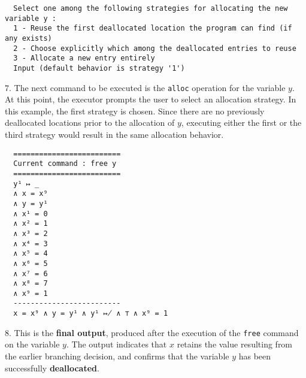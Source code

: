 \documentclass[parskip=half]{scrartcl}
\begin{document}
\begin{verbatim}
  Select one among the following strategies for allocating the new variable y :
  1 - Reuse the first deallocated location the program can find (if any exists)
  2 - Choose explicitly which among the deallocated entries to reuse
  3 - Allocate a new entry entirely
  Input (default behavior is strategy '1')
\end{verbatim}
7. The next command to be executed is the \texttt{alloc} operation for the variable $y$. At this point, the executor prompts the user to select an allocation strategy. In this example, the first strategy is chosen. Since there are no previously deallocated locations prior to the allocation of $y$, executing either the first or the third strategy would result in the same allocation behavior.

\begin{verbatim}
  =========================
  Current command : free y
  =========================
  y¹ ↦ _
  ∧ x = x⁹ 
  ∧ y = y¹
  ∧ x¹ = 0
  ∧ x² = 1
  ∧ x³ = 2
  ∧ x⁴ = 3
  ∧ x⁵ = 4
  ∧ x⁶ = 5
  ∧ x⁷ = 6
  ∧ x⁸ = 7
  ∧ x⁹ = 1
  -------------------------
  x = x⁹ ∧ y = y¹ ∧ y¹ ↦̸ ∧ ⊤ ∧ x⁹ = 1
\end{verbatim}
8. This is the \textbf{final output}, produced after the execution of the \texttt{free} command on the variable $y$. The output indicates that $x$ retains the value resulting from the earlier branching decision, and confirms that the variable $y$ has been successfully \textbf{deallocated}.
\end{document}
